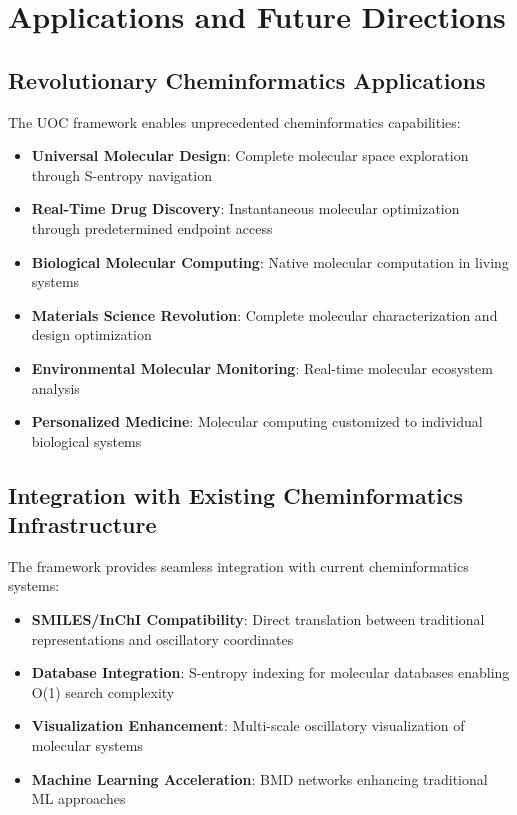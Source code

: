 \documentclass[12pt,a4paper]{article}
\begin{document}
\section{Applications and Future Directions}

\subsection{Revolutionary Cheminformatics Applications}

The UOC framework enables unprecedented cheminformatics capabilities:

\begin{itemize}
\item \textbf{Universal Molecular Design}: Complete molecular space exploration through S-entropy navigation
\item \textbf{Real-Time Drug Discovery}: Instantaneous molecular optimization through predetermined endpoint access
\item \textbf{Biological Molecular Computing}: Native molecular computation in living systems
\item \textbf{Materials Science Revolution}: Complete molecular characterization and design optimization
\item \textbf{Environmental Molecular Monitoring}: Real-time molecular ecosystem analysis
\item \textbf{Personalized Medicine}: Molecular computing customized to individual biological systems
\end{itemize}

\subsection{Integration with Existing Cheminformatics Infrastructure}

The framework provides seamless integration with current cheminformatics systems:

\begin{itemize}
\item \textbf{SMILES/InChI Compatibility}: Direct translation between traditional representations and oscillatory coordinates
\item \textbf{Database Integration}: S-entropy indexing for molecular databases enabling O(1) search complexity
\item \textbf{Visualization Enhancement}: Multi-scale oscillatory visualization of molecular systems
\item \textbf{Machine Learning Acceleration}: BMD networks enhancing traditional ML approaches
\end{itemize}
\end{document}
